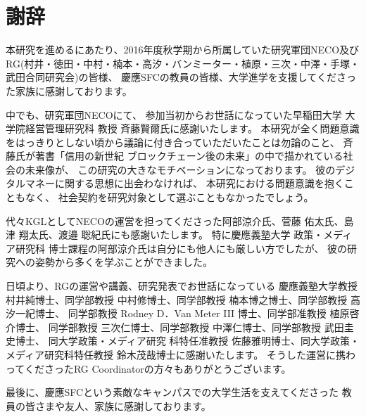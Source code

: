 \chapter*{謝辞}
本研究を進めるにあたり、2016年度秋学期から所属していた研究軍団NECO及び
RG(村井・徳田・中村・楠本・高汐・バンミーター・植原・三次・中澤・手塚・武田合同研究会)の皆様、
慶應SFCの教員の皆様、大学進学を支援してくださった家族に感謝しております。

中でも、研究軍団NECOにて、
参加当初からお世話になっていた早稲田大学 大学院経営管理研究科 教授 斉藤賢爾氏に感謝いたします。
本研究が全く問題意識をはっきりとしない頃から議論に付き合っていただいたことは勿論のこと、
斉藤氏が著書「信用の新世紀 ブロックチェーン後の未来」の中で描かれている社会の未来像が、
この研究の大きなモチベーションになっております。
彼のデジタルマネーに関する思想に出会わなければ、
本研究における問題意識を抱くこともなく、
社会契約を研究対象として選ぶこともなかったでしょう。

代々KGLとしてNECOの運営を担ってくださった阿部涼介氏、菅藤 佑太氏、島津 翔太氏、渡邉 聡紀氏にも感謝いたします。
特に慶應義塾大学 政策・メディア研究科 博士課程の阿部涼介氏は自分にも他人にも厳しい方でしたが、
彼の研究への姿勢から多くを学ぶことができました。

日頃より、RGの運営や講義、研究発表でお世話になっている
慶應義塾大学教授 村井純博士、同学部教授 中村修博士、同学部教授 楠本博之博士、同学部教授 高汐一紀博士、
同学部教授 Rodney D．Van Meter III 博士、同学部准教授 植原啓介博士、
同学部教授 三次仁博士、同学部教授 中澤仁博士、同学部教授 武田圭史博士、
同大学政策・メディア研究 科特任准教授 佐藤雅明博士、同大学政策・メディア研究科特任教授 鈴木茂哉博士に感謝いたします。
そうした運営に携わってくださったRG Coordinatorの方々もありがとうございます。

最後に、慶應SFCという素敵なキャンパスでの大学生活を支えてくださった
教員の皆さまや友人、家族に感謝しております。
